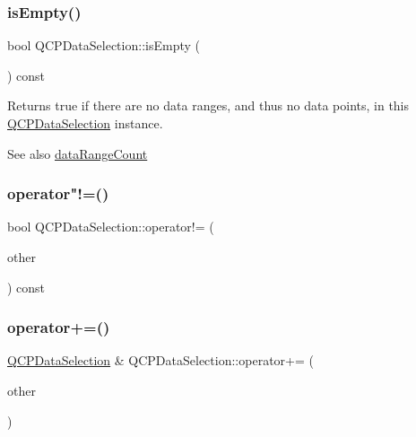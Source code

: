 \subsubsection{\texorpdfstring{isEmpty()}{isEmpty()}}
{\footnotesize\ttfamily bool Q\+C\+P\+Data\+Selection\+::is\+Empty (\begin{DoxyParamCaption}{ }\end{DoxyParamCaption}) const\hspace{0.3cm}{\ttfamily [inline]}}

Returns true if there are no data ranges, and thus no data points, in this \mbox{\hyperlink{class_q_c_p_data_selection}{Q\+C\+P\+Data\+Selection}} instance.

\begin{DoxySeeAlso}{See also}
\mbox{\hyperlink{class_q_c_p_data_selection_abd8869ccb231ab991e8576de931f647d}{data\+Range\+Count}} 
\end{DoxySeeAlso}
\mbox{\label{class_q_c_p_data_selection_a8324733cc88660ee4792ee60d6a4520c}} 
\subsubsection{\texorpdfstring{operator"!=()}{operator!=()}}
{\footnotesize\ttfamily bool Q\+C\+P\+Data\+Selection\+::operator!= (\begin{DoxyParamCaption}\item[{const \mbox{\hyperlink{class_q_c_p_data_selection}{Q\+C\+P\+Data\+Selection}} \&}]{other }\end{DoxyParamCaption}) const\hspace{0.3cm}{\ttfamily [inline]}}

\mbox{\label{class_q_c_p_data_selection_a4584d4b0ea5c4f095bd7b70f88eb5d9d}} 
\subsubsection{\texorpdfstring{operator+=()}{operator+=()}\hspace{0.1cm}{\footnotesize\ttfamily [1/2]}}
{\footnotesize\ttfamily \mbox{\hyperlink{class_q_c_p_data_selection}{Q\+C\+P\+Data\+Selection}} \& Q\+C\+P\+Data\+Selection\+::operator+= (\begin{DoxyParamCaption}\item[{const \mbox{\hyperlink{class_q_c_p_data_selection}{Q\+C\+P\+Data\+Selection}} \&}]{other }\end{DoxyParamCaption})}

